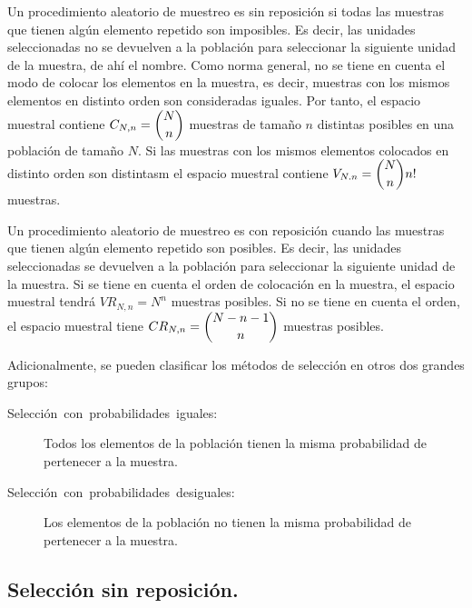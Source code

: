 Un procedimiento aleatorio de muestreo es sin reposici\'on si todas
las muestras que tienen alg\'un elemento repetido son imposibles. Es
decir, las unidades seleccionadas no se devuelven a la poblaci\'on para
seleccionar la siguiente unidad de la muestra, de ah\'i el nombre. Como
norma general, no se tiene en cuenta el modo de colocar los elementos
en la muestra, es decir, muestras con los mismos elementos en distinto
orden son consideradas iguales. Por tanto, el espacio muestral contiene
$C_{N,n}=\dbinom{N}{n}$ muestras de tama\~no $n$ distintas posibles
en una poblaci\'on de tama\~no $N$. Si las muestras con los mismos elementos
colocados en distinto orden son distintasm el espacio muestral contiene
$V_{N.n}=\dbinom{N}{n}n!$ muestras.

Un procedimiento aleatorio de muestreo es con reposici\'on cuando las
muestras que tienen alg\'un elemento repetido son posibles. Es decir,
las unidades seleccionadas se devuelven a la poblaci\'on para seleccionar
la siguiente unidad de la muestra. Si se tiene en cuenta el orden
de colocaci\'on en la muestra, el espacio muestral tendr\'a $VR_{N,n}=N^{n}$
muestras posibles. Si no se tiene en cuenta el orden, el espacio muestral
tiene $CR_{N,n}=\dbinom{N-n-1}{n}$ muestras posibles.

Adicionalmente, se pueden clasificar los m\'etodos de selecci\'on en otros
dos grandes grupos:
\begin{description}
\item [{Selecci\'on~con~probabilidades~iguales:}] Todos los elementos
de la poblaci\'on tienen la misma probabilidad de pertenecer a la muestra.
\item [{Selecci\'on~con~probabilidades~desiguales:}] Los elementos de
la poblaci\'on no tienen la misma probabilidad de pertenecer a la muestra.
\end{description}

\subsection{Selecci\'on sin reposici\'on.}

